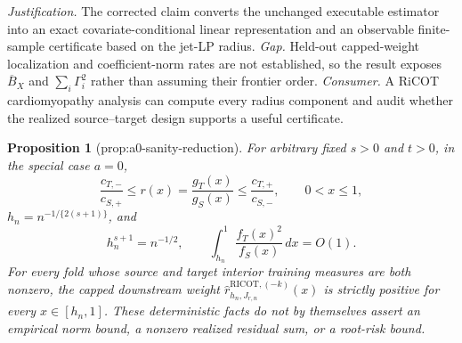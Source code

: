 \documentclass{article}
\newtheorem{proposition}{Proposition}
\begin{document}
\par\smallskip\noindent \textit{Justification.} The corrected claim converts the unchanged executable estimator into an exact covariate-conditional linear representation and an observable finite-sample certificate based on the jet-LP radius. \textit{Gap.} Held-out capped-weight localization and coefficient-norm rates are not established, so the result exposes \(\overline B_X\) and \(\sum_i\Gamma_i^2\) rather than assuming their frontier order. \textit{Consumer.} A RiCOT cardiomyopathy analysis can compute every radius component and audit whether the realized source--target design supports a useful certificate.

\begin{proposition}[prop:a0-sanity-reduction]\label{prop:a0-sanity-reduction}
For arbitrary fixed \(s>0\) and \(t>0\), in the special case \(a=0\),
\[
\frac{c_{T,-}}{c_{S,+}}\le r(x)=\frac{g_T(x)}{g_S(x)}\le\frac{c_{T,+}}{c_{S,-}},\qquad 0<x\le1,
\]
\(h_n=n^{-1/\{2(s+1)\}}\), and
\[
h_n^{s+1}=n^{-1/2},\qquad \int_{h_n}^1\frac{f_T(x)^2}{f_S(x)}\,dx=O(1).
\]
For every fold whose source and target interior training measures are both nonzero, the capped downstream weight \(\widehat r^{\mathrm{RICOT},(-k)}_{h_n,J_{r,n}}(x)\) is strictly positive for every \(x\in[h_n,1]\). These deterministic facts do not by themselves assert an empirical norm bound, a nonzero realized residual sum, or a root-risk bound.
\end{proposition}
\end{document}
